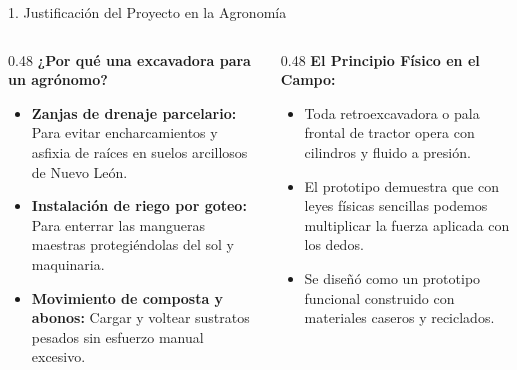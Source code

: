 \documentclass[
  spanish,
  aspectratio=169,
  xcolor={dvipsnames,table}
]{beamer}
\begin{document}
\begin{frame}{1. Justificación del Proyecto en la Agronomía}
  \begin{columns}[T]
    \begin{column}{0.48\textwidth}
      \textbf{\color{uanlblue}¿Por qué una excavadora para un agrónomo?}
      \begin{itemize}
        \item \textbf{Zanjas de drenaje parcelario:} Para evitar encharcamientos y asfixia de raíces en suelos arcillosos de Nuevo León.
        \item \textbf{Instalación de riego por goteo:} Para enterrar las mangueras maestras protegiéndolas del sol y maquinaria.
        \item \textbf{Movimiento de composta y abonos:} Cargar y voltear sustratos pesados sin esfuerzo manual excesivo.
      \end{itemize}
    \end{column}
    \begin{column}{0.48\textwidth}
      \textbf{\color{uanlblue}El Principio Físico en el Campo:}
      \begin{itemize}
        \item Toda retroexcavadora o pala frontal de tractor opera con cilindros y fluido a presión.
        \item El prototipo demuestra que con leyes físicas sencillas podemos multiplicar la fuerza aplicada con los dedos.
        \item Se diseñó como un prototipo funcional construido con materiales caseros y reciclados.
      \end{itemize}
    \end{column}
  \end{columns}
\end{frame}
\end{document}

